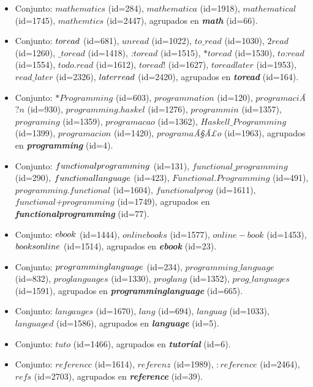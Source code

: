 \begin{itemize}
\item    Conjunto: $mathematics$ (id=284), $mathematica$ (id=1918), $mathematical$ (id=1745), $mathemtics$ (id=2447), agrupados en {\bf \em math} (id=66).

\item    Conjunto: $to\-read$ (id=681), $unread$ (id=1022), $to\_read$ (id=1030), $2read$ (id=1260), $\_toread$ (id=1418), {\em :$toread$} (id=1515), $*toread$ (id=1530), {\em $to$:$read$} (id=1554), $todo.read$ (id=1612), $toread!$ (id=1627), $toreadlater$ (id=1953), $read\_later$ (id=2326), $later\-read$ (id=2420), agrupados en {\bf \em toread} (id=164).

\item    Conjunto: $*Programming$ (id=603), $programmation$ (id=120), {\em $programaci$Ã$?n$} (id=930), $programming.haskel$ (id=1276), $programmin$ (id=1357), $programing$ (id=1359), $programacao$ (id=1362), $Haskell\_Programming$ (id=1399), $programacion$ (id=1420), {\em $programa$Ã§Ã£$o$} (id=1963), agrupados en {\bf \em programming} (id=4).

\item    Conjunto: $functional\-programming$ (id=131), $functional\_programming$ (id=290), $functional\-language$ (id=423), $Functional.Programming$ (id=491), $programming.functional$ (id=1604), $functionalprog$ (id=1611), \\ {\em $functional$+$programming$} (id=1749), agrupados en {\bf \em functionalprogramming} (id=77).

\item    Conjunto: $e\-book$ (id=1444), $onlinebooks$ (id=1577), $online-book$ (id=1453), $books\-on\-line$ (id=1514), agrupados en {\bf \em ebook} (id=23).

\item    Conjunto: $programming\-language$ (id=234), $programming\_language$ (id=832), $proglanguages$ (id=1330), $proglang$ (id=1352), $prog\_languages$ (id=1591), agrupados en {\bf \em programminglanguage} (id=665).

\item    Conjunto: $langauges$ (id=1670), $lang$ (id=694), $languag$ (id=1033), $languaged$ (id=1586), agrupados en {\bf \em language} (id=5).

\item    Conjunto: $tuto$ (id=1466), agrupados en {\bf \em tutorial} (id=6).

\item    Conjunto: $referencc$ (id=1614), $referenz$ (id=1989), $:reference$ (id=2464), $refs$ (id=2703), agrupados en {\bf \em reference} (id=39).
\end{itemize}

